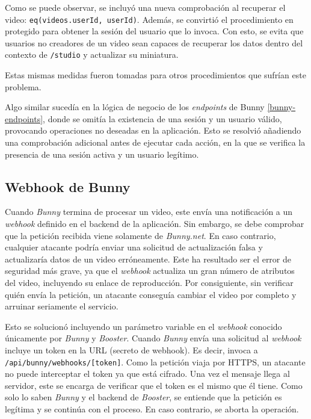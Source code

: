 Como se puede observar, se incluyó una nueva comprobación al recuperar el video: \texttt{eq(videos.userId, userId)}. Además, se convirtió el procedimiento en protegido para obtener la sesión del usuario que lo invoca. Con esto, se evita que usuarios no creadores de un video sean capaces de recuperar los datos dentro del contexto de \texttt{/studio} y actualizar su miniatura. 

Estas mismas medidas fueron tomadas para otros procedimientos que sufrían este problema. 

Algo similar sucedía en la lógica de negocio de los \textit{endpoints} de Bunny \ref{bunny-endpoints}, donde se omitía la existencia de una sesión y un usuario válido, provocando operaciones no deseadas en la aplicación. Esto se resolvió añadiendo una comprobación adicional antes de ejecutar cada acción, en la que se verifica la presencia de una sesión activa y un usuario legítimo. 
\subsection{Webhook de Bunny}

Cuando \textit{Bunny} termina de procesar un video, este envía una notificación a un \textit{webhook} definido en el backend de la aplicación. Sin embargo, se debe comprobar que la petición recibida viene solamente de \textit{Bunny.net}. En caso contrario, cualquier atacante podría enviar una solicitud de actualización falsa y actualizaría datos de un video erróneamente. Este ha resultado ser el error de seguridad más grave, ya que el \textit{webhook} actualiza un gran número de atributos del video, incluyendo su enlace de reproducción. Por consiguiente, sin verificar quién envía la petición, un atacante conseguía cambiar el video por completo y arruinar seriamente el servicio. 

Esto se solucionó incluyendo un parámetro variable en el \textit{webhook} conocido únicamente por \textit{Bunny} y \textit{Booster}. Cuando \textit{Bunny} envía una solicitud al \textit{webhook} incluye un token en la URL (secreto de webhook). Es decir, invoca a \texttt{/api/bunny/webhooks/[token]}. Como la petición viaja por HTTPS, un atacante no puede interceptar el token ya que está cifrado. Una vez el mensaje llega al servidor, este se encarga de verificar que el token es el mismo que él tiene. Como solo lo saben \textit{Bunny} y el backend de \textit{Booster}, se entiende que la petición es legítima y se continúa con el proceso. En caso contrario, se aborta la operación. 


